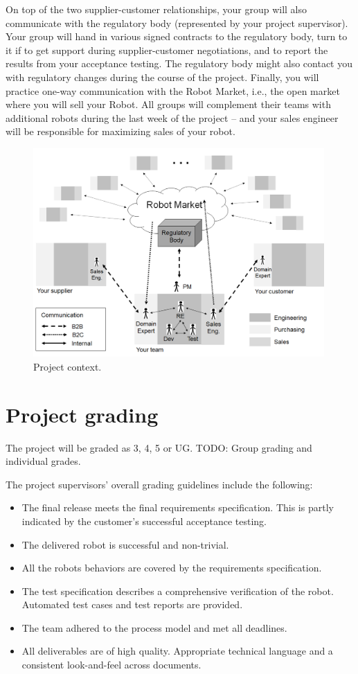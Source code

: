 \documentclass{scrreprt}
\begin{document}
On top of the two supplier-customer relationships, your group will also communicate with the regulatory body (represented by your project supervisor). Your group will hand in various signed contracts to the regulatory body, turn to it if to get support during supplier-customer negotiations, and to report the results from your acceptance testing. The regulatory body might also contact you with regulatory changes during the course of the project. Finally, you will practice one-way communication with the Robot Market, i.e., the open market where you will sell your Robot. All groups will complement their teams with additional robots during the last week of the project -- and your sales engineer will be responsible for maximizing sales of your robot. 

\begin{figure}
\centering
\includegraphics[width=0.99\textwidth]{figures/projectContext.png}
\caption{Project context.}
\label{fig:context}
\end{figure}

\section{Project grading}
The project will be graded as 3, 4, 5 or UG. TODO: Group grading and individual grades.

The project supervisors' overall grading guidelines include the following:
\begin{itemize}
\item The final release meets the final requirements specification. This is partly indicated by the customer's successful acceptance testing.
\item The delivered robot is successful and non-trivial.
\item All the robots behaviors are covered by the requirements specification.
\item The test specification describes a comprehensive verification of the robot. Automated test cases and test reports are provided.
\item The team adhered to the process model and met all deadlines.
\item All deliverables are of high quality. Appropriate technical language and a consistent look-and-feel across documents.
\end{itemize}
\end{document}
